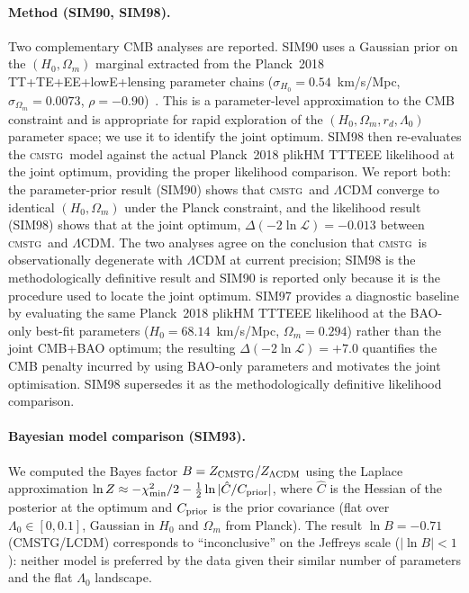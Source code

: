 \documentclass[12pt,a4paper]{article}
\newcommand{\CMSTG}{\textsc{cmstg}}
\newcommand{\Lz}{\Lambda_0}
\begin{document}
\paragraph{Method (SIM90, SIM98).} Two complementary CMB analyses are reported.
SIM90 uses a Gaussian prior on the $(H_0, \Omega_m)$ marginal extracted from
the Planck~2018 TT+TE+EE+lowE+lensing parameter chains ($\sigma_{H_0} =
0.54$~km/s/Mpc, $\sigma_{\Omega_m} = 0.0073$, $\rho = -0.90$)~\cite{Planck2018}.
This is a parameter-level approximation to the CMB constraint and is appropriate
for rapid exploration of the $(H_0, \Omega_m, r_d, \Lz)$ parameter space; we use
it to identify the joint optimum. SIM98 then re-evaluates the \CMSTG\ model
against the actual Planck~2018 plikHM TTTEEE likelihood at the joint optimum,
providing the proper likelihood comparison. We report both: the parameter-prior
result (SIM90) shows that \CMSTG\ and $\Lambda$CDM converge to identical
$(H_0, \Omega_m)$ under the Planck constraint, and the likelihood result (SIM98)
shows that at the joint optimum, $\Delta(-2\ln\mathcal{L}) = -0.013$ between
\CMSTG\ and $\Lambda$CDM. The two analyses agree on the conclusion that \CMSTG\
is observationally degenerate with $\Lambda$CDM at current precision; SIM98 is
the methodologically definitive result and SIM90 is reported only because it is
the procedure used to locate the joint optimum.
SIM97 provides a diagnostic baseline by evaluating the same Planck~2018 plikHM
TTTEEE likelihood at the BAO-only best-fit parameters ($H_0 = 68.14$~km/s/Mpc,
$\Omega_m = 0.294$) rather than the joint CMB+BAO optimum; the resulting
$\Delta(-2\ln\mathcal{L}) = +7.0$ quantifies the CMB penalty incurred by using
BAO-only parameters and motivates the joint optimisation. SIM98 supersedes it
as the methodologically definitive likelihood comparison.

\paragraph{Bayesian model comparison (SIM93).} We computed the Bayes factor
$B = Z_{\rm CMSTG}/Z_{\Lambda\rm CDM}$ using the Laplace approximation
$\ln Z \approx -\chi^2_{\rm min}/2 - \frac{1}{2}\ln|\hat{C}/C_{\rm prior}|$,
where $\hat{C}$ is the Hessian of the posterior at the optimum and $C_{\rm prior}$
is the prior covariance (flat over $\Lz \in [0, 0.1]$, Gaussian in $H_0$ and
$\Omega_m$ from Planck). The result $\ln B = -0.71$ (CMSTG/LCDM) corresponds
to ``inconclusive'' on the Jeffreys scale ($|\ln B| < 1$): neither model is
preferred by the data given their similar number of parameters and the
flat $\Lz$ landscape.
\end{document}
